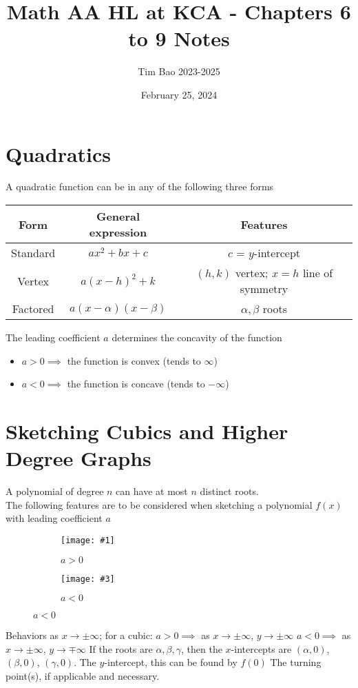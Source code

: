 \documentclass[11pt]{article}
\title{Math AA HL at KCA - Chapters 6 to 9 Notes}
\author{Tim Bao 2023-2025}
\date{February 25, 2024}
\newcommand{\lb}{\\[8pt]}
\newcommand{\doubleimg}[4]{\begin{center}
  \begin{figure}[H]
    \centering
    \begin{subfigure}{.45\textwidth}
      \centering
      \texttt{[image: \#1]}
      \caption{#2}
      \label{fig:sub1}
    \end{subfigure}
    \begin{subfigure}{.45\textwidth}
      \centering
      \texttt{[image: \#3]}
      \caption{#4}
      \label{fig:sub2}
    \end{subfigure}
  \end{figure}
\end{center}}
\begin{document}
\maketitle
\pagebreak

\section{Quadratics}

A quadratic function can be in any of the following three forms

\begin{center}
  \begin{tabular}{c|c|c}
    Form     & General expression         & Features                                  \\ \hline
    Standard & $ax^2 + bx + c$            & $c$ = $y$-intercept                       \\
    Vertex   & $a(x - h)^2 + k$           & $(h, k)$ vertex; $x = h$ line of symmetry \\
    Factored & $a(x - \alpha)(x - \beta)$ & $\alpha, \beta$ roots                     \\
  \end{tabular}
\end{center}

\noindent The leading coefficient $a$ determines the concavity of the function
\begin{itemize}
  \item $a > 0 \implies$ the function is convex (tends to $\infty$)
  \item $a < 0 \implies$ the function is concave (tends to $-\infty$)
\end{itemize}

\pagebreak

\section{Sketching Cubics and Higher Degree Graphs}

A polynomial of degree $n$ can have at most $n$ distinct roots. \lb
The following features are to be considered when sketching a polynomial $f(x)$ with leading coefficient $a$

\doubleimg{figs/cubic1.png}{$a > 0$}{figs/cubic2.png}{$a < 0$}

\begin{outline}[enumerate]
  \1 Behaviors as $x\to \pm\infty$; for a cubic:
  \2 $a > 0 \implies$ as $x\to\pm\infty$, $y\to\pm\infty$
  \2 $a < 0 \implies$ as $x\to\pm\infty$, $y\to\mp\infty$
  \1 If the roots are $\alpha, \beta, \gamma$, then the $x$-intercepts are $(\alpha, 0)$, $(\beta, 0)$, $(\gamma, 0)$.
  \1 The $y$-intercept, this can be found by $f(0)$
  \1 The turning point(s), if applicable and necessary.
\end{outline}
\end{document}
